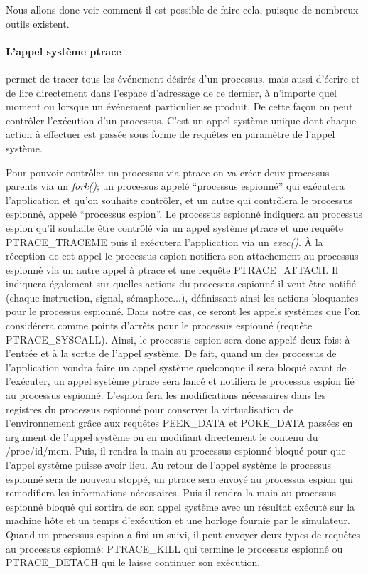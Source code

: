  Nous allons donc voir comment il est possible de faire cela, puisque de
 nombreux outils existent.
 
 \paragraph{L'appel système ptrace}\cite{INTERCEPTION:AS, INTERCEPTION:MARION}
 permet de tracer tous les événement désirés d'un processus, mais aussi d'écrire
 et de lire directement dans l'espace d'adressage de ce dernier, à n'importe
 quel moment ou lorsque un événement particulier se produit. De cette façon on
 peut contrôler l'exécution d'un processus. C'est un appel système unique dont
 chaque action à effectuer est passée sous forme de requêtes en paramètre de
 l'appel système.

Pour pouvoir contrôler un processus via ptrace on va créer deux processus
parents via un \textit{fork()}; un processus appelé ``processus espionné'' qui
exécutera l'application et qu'on souhaite contrôler, et un autre qui contrôlera
le processus espionné, appelé ``processus espion''. Le processus espionné
indiquera au processus espion qu'il souhaite être contrôlé via un appel système
ptrace et une requête PTRACE\_TRACEME puis il exécutera l'application via un
\textit{exec()}. À la réception de cet appel le processus espion notifiera son
attachement au processus espionné via un autre appel à ptrace et une requête
PTRACE\_ATTACH. Il indiquera également sur quelles actions du processus espionné
il veut être notifié (chaque instruction, signal, sémaphore...), définissant
ainsi les actions bloquantes pour le processus espionné. Dans notre cas, ce
seront les appels systèmes que l'on considérera comme points d'arrêts pour le
processus espionné (requête PTRACE\_SYSCALL). Ainsi, le processus espion sera
donc appelé deux fois: à l'entrée et à la sortie de l'appel système. De fait,
quand un des processus de l'application voudra faire un appel système quelconque
il sera bloqué avant de l'exécuter, un appel système ptrace sera lancé et
notifiera le processus espion lié au processus espionné. L'espion fera les
modifications nécessaires dans les registres du processus espionné pour
conserver la virtualisation de l'environnement grâce aux requêtes PEEK\_DATA et
POKE\_DATA passées en argument de l'appel système {\color{red}ou en modifiant
  directement le contenu du /proc/id/mem}. Puis, il rendra la main au processus
espionné bloqué pour que l'appel système puisse avoir lieu. Au retour de l'appel
système le processus espionné sera de nouveau stoppé, un ptrace sera envoyé au
processus espion qui remodifiera les informations nécessaires. Puis il rendra la
main au processus espionné bloqué qui sortira de son appel système avec un
résultat exécuté sur la machine hôte et un temps d'exécution et une horloge
fournie par le simulateur. Quand un processus espion a fini un suivi, il peut
envoyer deux types de requêtes au processus espionné: PTRACE\_KILL qui termine
le processus espionné ou PTRACE\_DETACH qui le laisse continuer son exécution.

